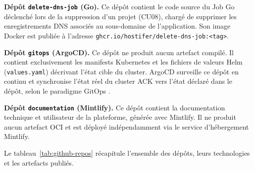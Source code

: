 \textbf{Dépôt \texttt{delete-dns-job} (Go).} Ce dépôt contient le code source du Job Go déclenché lors de la suppression d'un projet (CU08), chargé de supprimer les enregistrements DNS associés au sous-domaine de l'application. Son image Docker est publiée à l'adresse \texttt{ghcr.io/hostifer/delete-dns-job:<tag>}.

\textbf{Dépôt \texttt{gitops} (ArgoCD).} Ce dépôt ne produit aucun artefact compilé. Il contient exclusivement les manifests Kubernetes et les fichiers de valeurs Helm (\texttt{values.yaml}) décrivant l'état cible du cluster. ArgoCD surveille ce dépôt en continu et synchronise l'état réel du cluster ACK vers l'état déclaré dans le dépôt, selon le paradigme GitOps \cite{gitops-principles}.

\textbf{Dépôt \texttt{documentation} (Mintlify).} Ce dépôt contient la documentation technique et utilisateur de la plateforme, générée avec Mintlify. Il ne produit aucun artefact OCI et est déployé indépendamment via le service d'hébergement Mintlify.

Le tableau~\ref{tab:github-repos} récapitule l'ensemble des dépôts, leurs technologies et les artefacts publiés.

